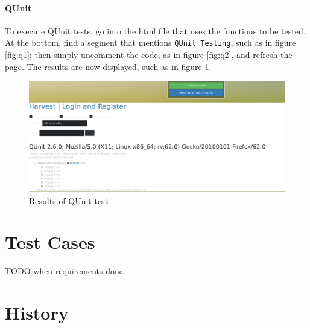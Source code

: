 \documentclass[12pt]{article}
\begin{document}
\paragraph{QUnit} To execute QUnit tests, go into the html file that uses the functions to be tested. At the bottom, find a segment that mentions \texttt{QUnit Testing}, such as in figure \ref{fig:q1}; then simply uncomment the code, as in figure \ref{fig:q2}, and refresh the page. The results are now displayed, such as in figure \ref{fig:qr}.

\begin{figure}
\includegraphics[width=\textwidth]{images/qr.png}
\caption{Results of QUnit test}
\label{fig:qr}
\end{figure}

\section{Test Cases}
TODO when requirements done.

\section{History}
\end{document}
